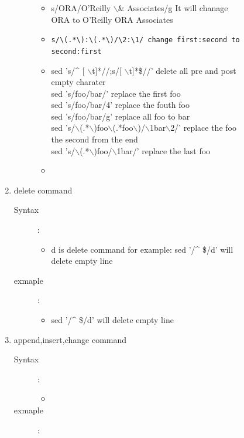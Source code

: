 \documentclass[a4paper,12pt,twoside]{book}
\begin{document}
\begin{CJK*}{UTF8}{song}
\begin{description}
\begin{description}
\begin{enumerate}
\begin{description}
\begin{itemize}
						\item s/ORA/O'Reilly $\backslash$\& Associates/g  It will chanage ORA to O'Reilly ORA Associates
						\item \verb|s/\(.*\):\(.*\)/\2:\1/ change first:second to second:first|
						\item 	sed 's/\^{} [ $\backslash$t]*//;s/[ $\backslash$t]*\$//'  delete all pre and post empty charater \\
							sed 's/foo/bar/'                  replace the first foo \\
							sed 's/foo/bar/4'                 replace the fouth foo \\
							sed 's/foo/bar/g'                 replace all foo to bar \\
							sed 's/$\backslash$(.*$\backslash$)foo$\backslash$(.*foo$\backslash$)/$\backslash$1bar$\backslash$2/'     replace the foo the second from the end \\
							sed 's/$\backslash$(.*$\backslash$)foo/$\backslash$1bar/'             replace the last foo \\
						\item
						\end{itemize}
					\end{description}
				\item delete command
					\begin{description}
					\item[Syntax]: \\
						\begin{itemize}
						\item d is delete command for example: sed '/\^{} \$/d' will delete empty line
						\end{itemize}
					\item[exmaple]: \\
						\begin{itemize}
						\item sed '/\^{} \$/d' will delete empty line
						\end{itemize}
					\end{description}
				\item append,insert,change command
					\begin{description}
					\item[Syntax]: \\
						\begin{itemize}
						\item
						\end{itemize}
					\item[exmaple]: \\

\end{description}
\end{enumerate}
\end{description}
\end{description}
\end{CJK*}
\end{document}
